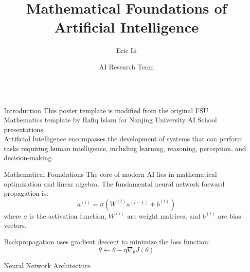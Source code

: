 \documentclass{ctexbeamer}
\title{Mathematical Foundations of Artificial Intelligence}
\author{Eric Li \inst{1} \and AI Research Team \inst{1}}
\institute[shortinst]{\inst{1} School of Artificial Intelligence, Nanjing University}
\newlength{\colwidth}
\begin{document}
\begin{frame}[t]
\begin{columns}[t]

\begin{column}{\colwidth}
\begin{block}{Introduction}
This poster template is modified from the original FSU Mathematics template by Rafiq Islam\cite{fsumathposter25} for Nanjing University AI School presentations\cite{njumathposter25}.\\
Artificial Intelligence encompasses the development of systems that can perform tasks requiring human intelligence, including learning, reasoning, perception, and decision-making.
\end{block}

\begin{block}{Mathematical Foundations}
    The core of modern AI lies in mathematical optimization and linear algebra. The fundamental neural network forward propagation is:
        \[
        a^{(l)} = \sigma(W^{(l)}a^{(l-1)} + b^{(l)})
        \]
    where $\sigma$ is the activation function, $W^{(l)}$ are weight matrices, and $b^{(l)}$ are bias vectors.

    Backpropagation uses gradient descent to minimize the loss function:
        \[
        \theta \leftarrow \theta - \eta \nabla_\theta J(\theta)
        \]
\end{block}

\begin{block}{Neural Network Architecture}
    \begin{figure}
        \centering
\end{figure}
\end{block}
\end{column}
\end{columns}
\end{frame}
\end{document}
